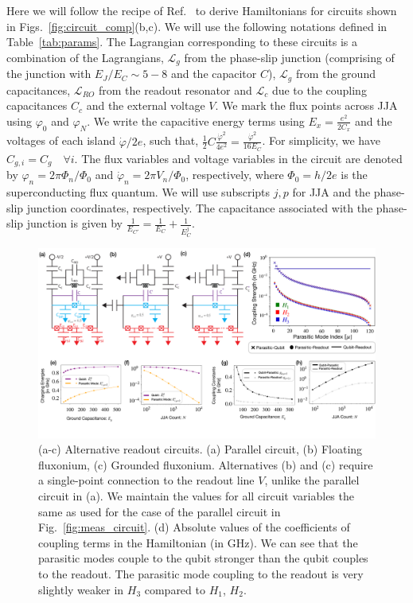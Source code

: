 \documentclass[prx,showpacs,notitlepage,twocolumn,superscriptaddress,nofootinbib,preprintnumbers,floatfix]{revtex4-2}
\begin{document}
Here we will follow the recipe of Ref.~\cite{viola2015collective} to derive Hamiltonians for circuits shown in Figs.~\ref{fig:circuit_comp}(b,c). We will use the following notations defined in Table~\ref{tab:params}. The Lagrangian corresponding to these circuits is a combination of the Lagrangians, $\mathcal{L}_g$ from the phase-slip junction (comprising of the junction with $E_J/E_C\sim 5-8$ and the capacitor $C$), $\mathcal{L}_{g}$ from the ground capacitances, $\mathcal{L}_{RO}$ from the readout resonator and $\mathcal{L}_c$ due to the coupling capacitances $C_c$ and the external voltage $V$. We mark the flux points across JJA using $\varphi_0$ and $\varphi_{N}$. We write the capacitive energy terms using $E_x=\frac{e^2}{2C_x}$ and the voltages of each island $\dot{\varphi}/2e$, such that, $\frac{1}{2}C\frac{\dot{\varphi}^2}{4e^2}=\frac{\dot{\varphi}^2}{16E_C}$. For simplicity, we have $C_{g,i}=C_g\quad\forall i$. The flux variables and voltage variables in the circuit are denoted by $\varphi_n=2\pi\Phi_n/\Phi_0$ and $\dot{\varphi}_n=2\pi V_n/\Phi_0$, respectively, where $\Phi_0=h/2e$ is the superconducting flux quantum. We will use subscripts $j, p$ for JJA and the phase-slip junction coordinates, respectively. The capacitance associated with the phase-slip junction is given by $\frac{1}{E_{C'}}=\frac{1}{E_C}+\frac{1}{E^{j}_{C}}$.
\begin{figure}
    \centering
    \includegraphics[width=\linewidth]{Figures/Circuit_choice.pdf}
    \caption{(a-c) Alternative readout circuits. (a) Parallel circuit, (b) Floating fluxonium, (c) Grounded fluxonium. Alternatives (b) and (c) require a single-point connection to the readout line $V$, unlike the parallel circuit in (a). We maintain the values for all circuit variables the same as used for the case of the parallel circuit in Fig.~\ref{fig:meas_circuit}. (d) Absolute values of the coefficients of coupling terms in the Hamiltonian (in GHz). We can see that the parasitic modes couple to the qubit stronger than the qubit couples to the readout. The parasitic mode coupling to the readout is very slightly weaker in $H_3$ compared to $H_1$, $H_2$. }
    \label{fig:circuit_choice}
\end{figure}
\end{document}
